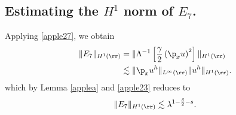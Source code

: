 \subsection{Estimating the $H^1$ norm of $\hyperref[all_errors_together]{E_7}$.} Applying \eqref{apple27}, we obtain
\begin{equation}
	\begin{split}
		\|E_7\|_{H^1(\rr)} 
		& = \|\Lambda^{-1} \left[ \frac{\gamma}{2}\left( \p_x u \right)^2
		\right]\|_{H^1(\rr)}
		\\
		& \lesssim  \|\p_x u^h\|_{L^\infty(\rr)} \|u^h\|_{H^1(\rr)}.
		\label{apple32}
	\end{split}
\end{equation}
which by Lemma \ref{applea} and \eqref{apple23} reduces to
\begin{equation}
	\begin{split}
		\|E_7\|_{H^1(\rr)} \lesssim \lambda^{1-\frac{\delta}{2}-s}.
		\label{apple33'}
	\end{split}
\end{equation}
%
%
%
%

